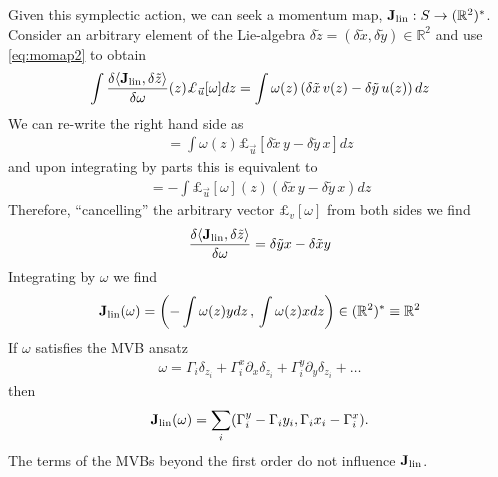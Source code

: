 \documentclass[12pt]{amsart}
\theoremstyle{remark}
\begin{document}
Given this symplectic action, we can seek a momentum map, ${\bf J}_{\rm lin}:S \to (\mathbb{R}^2)^*$.  Consider an arbitrary element of the Lie-algebra $\delta \tilde{z}  = (\delta \tilde{x}, \delta \tilde{y}) \in \mathbb{R}^2$ and use \eqref{eq:momap2} to obtain
\begin{align*}
  \int \frac{\delta \langle {\bf J}_{\rm lin} , \delta \tilde{z} \rangle}{\delta \omega}(z)   \pounds_{\vec{u}}[\omega] dz
  = \int \omega(z) \left( \delta \tilde{x} \, v(z) - \delta \tilde{y} \, u(z) \right) dz
\end{align*}
We can re-write the right hand side as
\begin{align*}
  = \int \omega(z)  \pounds_{\vec{u}} [ \delta \tilde{x} \, y - \delta \tilde{y} \, x] dz
\end{align*}
and upon integrating by parts this is equivalent to
\begin{align*}
  = - \int \pounds_{\vec{u}}[\omega](z)  \left( \delta \tilde{x}\, y - \delta \tilde{y}\, x \right) dz
\end{align*}
Therefore, ``cancelling'' the arbitrary vector $\pounds_v[\omega]$ from both sides we find
\begin{align*}
  \frac{\delta  \langle {\bf J}_{\rm lin} , \delta \tilde{z} \rangle}{\delta \omega} = \delta \tilde{y} x - \delta \tilde{x} y
\end{align*}
Integrating by $\omega$ we find
\begin{align*}
    {\bf J}_{\rm lin}(\omega) = \left( -\int \omega(z) y dz \, , \, \int \omega(z) x dz \right) \in (\mathbb{R}^2)^* \equiv \mathbb{R}^2
\end{align*}
If $\omega$ satisfies the MVB ansatz
\begin{align*}
  \omega = \Gamma_i \delta_{z_i} + \Gamma_i^x \partial_x \delta_{z_i} + \Gamma_i^y \partial_y \delta_{z_i} + \dots
\end{align*}
then
\begin{align*}
  {\bf J}_{\rm lin}(\omega) = \sum_i ( \Gamma_i^{y} - \Gamma_i y_i , \Gamma_i x_i -\Gamma_i^{x} ).
\end{align*}
The terms of the MVBs beyond the first order do not influence ${\bf J}_{\rm lin}$.
\end{document}
